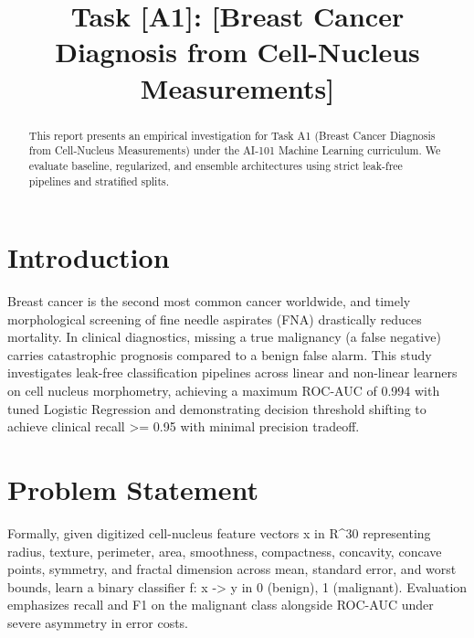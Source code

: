 \documentclass[conference]{IEEEtran}
\begin{document}
\title{Task [A1]: [Breast Cancer Diagnosis from Cell-Nucleus Measurements]}

\author{
}

\maketitle

\begin{abstract}
This report presents an empirical investigation for Task A1 (Breast Cancer Diagnosis from Cell-Nucleus Measurements) under the AI-101 Machine Learning curriculum. We evaluate baseline, regularized, and ensemble architectures using strict leak-free pipelines and stratified splits.
\end{abstract}

\section{Introduction}
Breast cancer is the second most common cancer worldwide, and timely morphological screening of fine needle aspirates (FNA) drastically reduces mortality. In clinical diagnostics, missing a true malignancy (a false negative) carries catastrophic prognosis compared to a benign false alarm. This study investigates leak-free classification pipelines across linear and non-linear learners on cell nucleus morphometry, achieving a maximum ROC-AUC of 0.994 with tuned Logistic Regression and demonstrating decision threshold shifting to achieve clinical recall >= 0.95 with minimal precision tradeoff.

\section{Problem Statement}
Formally, given digitized cell-nucleus feature vectors x in R^30 representing radius, texture, perimeter, area, smoothness, compactness, concavity, concave points, symmetry, and fractal dimension across mean, standard error, and worst bounds, learn a binary classifier f: x -> y in {0 (benign), 1 (malignant)}. Evaluation emphasizes recall and F1 on the malignant class alongside ROC-AUC under severe asymmetry in error costs.
\end{document}
